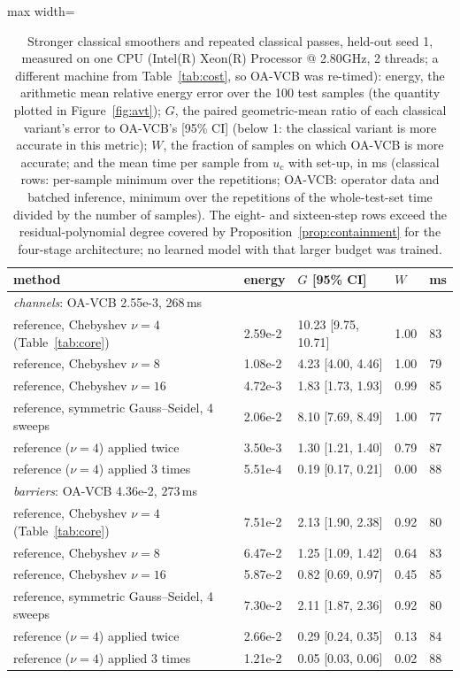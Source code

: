 \begin{table}[tbp]\centering\footnotesize\setlength{\tabcolsep}{4pt}
\caption{Stronger classical smoothers and repeated classical passes, held-out seed 1, measured on one CPU (Intel(R) Xeon(R) Processor @ 2.80GHz, 2 threads; a different machine from Table~\ref{tab:cost}, so OA-VCB was re-timed): energy, the arithmetic mean relative energy error over the 100 test samples (the quantity plotted in Figure~\ref{fig:avt}); $G$, the paired geometric-mean ratio of each classical variant's error to OA-VCB's [95\% CI] (below 1: the classical variant is more accurate in this metric); $W$, the fraction of samples on which OA-VCB is more accurate; and the mean time per sample from $u_c$ with set-up, in ms (classical rows: per-sample minimum over the repetitions; OA-VCB: operator data and batched inference, minimum over the repetitions of the whole-test-set time divided by the number of samples). The eight- and sixteen-step rows exceed the residual-polynomial degree covered by Proposition~\ref{prop:containment} for the four-stage architecture; no learned model with that larger budget was trained.}\label{tab:avt}
\begin{adjustbox}{max width=\linewidth}
\begin{tabular}{lllll}\toprule
method & energy & $G$ [95\% CI] & $W$ & ms \\\midrule
\multicolumn{5}{l}{\emph{channels}: OA-VCB 2.55e-3, 268\,ms} \\
\quad reference, Chebyshev $\nu=4$ (Table~\ref{tab:core}) & 2.59e-2 & 10.23 [9.75, 10.71] & 1.00 & 83 \\
\quad reference, Chebyshev $\nu=8$ & 1.08e-2 & 4.23 [4.00, 4.46] & 1.00 & 79 \\
\quad reference, Chebyshev $\nu=16$ & 4.72e-3 & 1.83 [1.73, 1.93] & 0.99 & 85 \\
\quad reference, symmetric Gauss--Seidel, 4 sweeps & 2.06e-2 & 8.10 [7.69, 8.49] & 1.00 & 77 \\
\quad reference ($\nu=4$) applied twice & 3.50e-3 & 1.30 [1.21, 1.40] & 0.79 & 87 \\
\quad reference ($\nu=4$) applied 3 times & 5.51e-4 & 0.19 [0.17, 0.21] & 0.00 & 88 \\
\multicolumn{5}{l}{\emph{barriers}: OA-VCB 4.36e-2, 273\,ms} \\
\quad reference, Chebyshev $\nu=4$ (Table~\ref{tab:core}) & 7.51e-2 & 2.13 [1.90, 2.38] & 0.92 & 80 \\
\quad reference, Chebyshev $\nu=8$ & 6.47e-2 & 1.25 [1.09, 1.42] & 0.64 & 83 \\
\quad reference, Chebyshev $\nu=16$ & 5.87e-2 & 0.82 [0.69, 0.97] & 0.45 & 85 \\
\quad reference, symmetric Gauss--Seidel, 4 sweeps & 7.30e-2 & 2.11 [1.87, 2.36] & 0.92 & 80 \\
\quad reference ($\nu=4$) applied twice & 2.66e-2 & 0.29 [0.24, 0.35] & 0.13 & 84 \\
\quad reference ($\nu=4$) applied 3 times & 1.21e-2 & 0.05 [0.03, 0.06] & 0.02 & 88 \\
\bottomrule\end{tabular}
\end{adjustbox}
\end{table}
